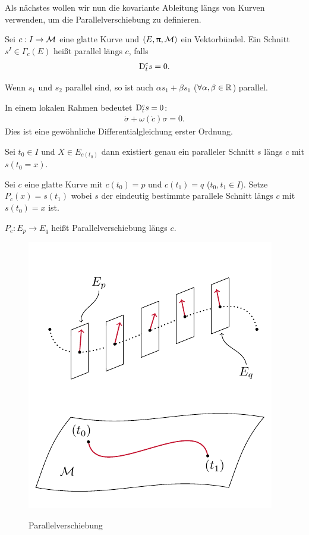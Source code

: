 Als nächstes wollen wir nun die kovariante Ableitung längs von Kurven verwenden, um die Parallelverschiebung zu definieren.
\begin{defs}[Parallelität]
Sei $c: I \to \mathcal{M}$ eine glatte Kurve und $(E, \uppi, \mathcal{M})$ ein Vektorbündel.
Ein Schnitt $s^I \in \Gamma_c (E)$ heißt parallel längs $c$, falls 
\begin{align}
\mathrm{D}^c_t s = 0.
\end{align}
\end{defs}
\begin{bem}
Wenn $s_1$ und $s_2$ parallel sind, so ist auch $\alpha s_1 + \beta s_1$ ($\forall \alpha, \beta \in \mathbb{R}$) parallel.
\end{bem}
In einem lokalen Rahmen bedeutet $\mathrm{D}^c_t s = 0$:
\begin{align}
\dot{\sigma} + \omega(\dot{c}) \sigma = 0.
\end{align}
Dies ist eine gewöhnliche Differentialgleichung erster Ordnung.
\begin{lem}
Sei $t_0 \in I$ und $X \in E_{c(t_0)}$ dann existiert genau ein paralleler Schnitt $s$ längs $c$ mit $s(t_0 = x)$.
\end{lem}
Sei $c$ eine glatte Kurve mit $c(t_0) = p$ und $c(t_1)=q$ ($t_0, t_1 \in I$).
Setze $P_c(x) = s(t_1)$ wobei $s$ der eindeutig bestimmte parallele Schnitt längs $c$ mit $s(t_0) = x$ ist.
\begin{defs}[Parallelverschiebung]
$P_c : E_p \to E_q$ heißt Parallelverschiebung längs $c$.
\begin{figure}[H]
\centering
\includegraphics[width=0.7\linewidth]{figures/tikz/parallel_shift_dgl.pdf}
\label{img:parallel_shift:dgl}
\caption{Parallelverschiebung}
\end{figure} 
\end{defs}
